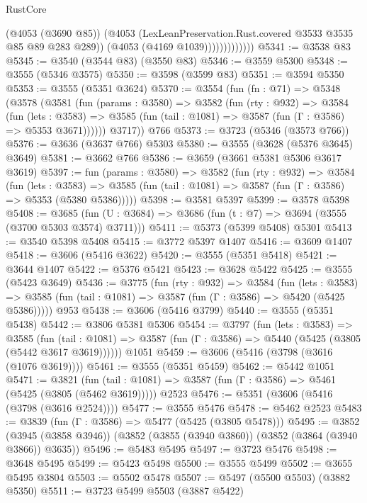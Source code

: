 \begin{lexlean}{RustCore}
\begin{coremodule}
                          (@4053 (@3690 @85))
                          (@4053 (LexLeanPreservation.Rust.covered @3533 @3535 @85 @89 @283 @289))
                          (@4053 (@4169 @1039)))))))))))))
@5341 := @3538 @83
@5345 := @3540 (@3544 @83) (@3550 @83)
@5346 := @3559 @5300
@5348 := @3555 (@5346 @3575)
@5350 := @3598 (@3599 @83)
@5351 := @3594 @5350
@5353 := @3555 (@5351 @3624)
@5370 := @3554
    (fun (fn : @71) =>
    @5348
      (@3578
        (@3581
          (fun (params : @3580) =>
          @3582
            (fun (rty : @932) =>
            @3584
              (fun (lets : @3583) =>
              @3585 (fun (tail : @1081) => @3587 (fun (Γ : @3586) => @5353 @3671))))))
        @3717))
    @766
@5373 := @3723 (@5346 (@3573 @766))
@5376 := @3636 (@3637 @766) @5303
@5380 := @3555 (@3628 (@5376 @3645) @3649)
@5381 := @3662 @766
@5386 := @3659 (@3661 @5381 @5306 @3617 @3619)
@5397 := fun (params : @3580) =>
  @3582
    (fun (rty : @932) =>
    @3584
      (fun (lets : @3583) =>
      @3585 (fun (tail : @1081) => @3587 (fun (Γ : @3586) => @5353 (@5380 @5386)))))
@5398 := @3581 @5397
@5399 := @3578 @5398
@5408 := @3685 (fun (U : @3684) => @3686 (fun (t : @7) => @3694 (@3555 (@3700 @5303 @3574) @3711)))
@5411 := @5373 (@5399 @5408) @5301
@5413 := @3540 @5398 @5408
@5415 := @3772 @5397 @1407
@5416 := @3609 @1407
@5418 := @3606 (@5416 @3622)
@5420 := @3555 (@5351 @5418)
@5421 := @3644 @1407
@5422 := @5376 @5421
@5423 := @3628 @5422
@5425 := @3555 (@5423 @3649)
@5436 := @3775
    (fun (rty : @932) =>
    @3584
      (fun (lets : @3583) =>
      @3585 (fun (tail : @1081) => @3587 (fun (Γ : @3586) => @5420 (@5425 @5386)))))
    @953
@5438 := @3606 (@5416 @3799)
@5440 := @3555 (@5351 @5438)
@5442 := @3806 @5381 @5306
@5454 := @3797
    (fun (lets : @3583) =>
    @3585
      (fun (tail : @1081) => @3587 (fun (Γ : @3586) => @5440 (@5425 (@3805 (@5442 @3617 @3619))))))
    @1051
@5459 := @3606 (@5416 (@3798 (@3616 (@1076 @3619))))
@5461 := @3555 (@5351 @5459)
@5462 := @5442 @1051
@5471 := @3821
    (fun (tail : @1081) => @3587 (fun (Γ : @3586) => @5461 (@5425 (@3805 (@5462 @3619)))))
    @2523
@5476 := @5351 (@3606 (@5416 (@3798 (@3616 @2524))))
@5477 := @3555 @5476
@5478 := @5462 @2523
@5483 := @3839 (fun (Γ : @3586) => @5477 (@5425 (@3805 @5478)))
@5495 := @3852
    (@3945 (@3858 @3946))
    (@3852 (@3855 (@3940 @3860)) (@3852 (@3864 (@3940 @3866)) @3635))
@5496 := @5483 @5495
@5497 := @3723 @5476
@5498 := @3648 @5495
@5499 := @5423 @5498
@5500 := @3555 @5499
@5502 := @3655 @5495 @3804
@5503 := @5502 @5478
@5507 := @5497 (@5500 @5503) (@3882 @5350)
@5511 := @3723 @5499 @5503 (@3887 @5422)

\end{coremodule}
\end{lexlean}
